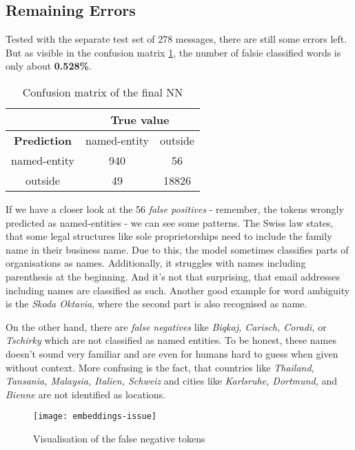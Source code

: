 \subsection{Remaining Errors}

Tested with the separate test set of 278 messages, there are still some errors left. But as visible in the confusion matrix \ref{tbl:final-errors}, the number of falsie classified words is only about \textbf{0.528\%}.

\begin{table}[ht!]
    \centering
    \begin{tabular}{|c|c|c|}
        \hline
        & \multicolumn{2}{c|}{\textbf{True value}} \\
        \hline
        \textbf{Prediction} & \cellcolor[HTML]{eaeaf2} named-entity & \cellcolor[HTML]{eaeaf2} outside \\
        \hline
        \cellcolor[HTML]{eaeaf2} named-entity & 940 & 56 \\
        \hline
        \cellcolor[HTML]{eaeaf2} outside & 49 & 18826 \\
        \hline
    \end{tabular}
    \caption{Confusion matrix of the final NN}
    \label{tbl:final-errors}
\end{table}

If we have a closer look at the 56 \emph{false positives} - remember, the tokens wrongly predicted as named-entities - we can see some patterns. The Swiss law states, that some legal structures like sole proprietorships need to include the family name in their business name. Due to this, the model sometimes classifies parts of organisations as names. Additionally, it struggles with names including parenthesis at the beginning. And it's not that surprising, that email addresses including names are classified as such. Another good example for word ambiguity is the \emph{Skoda Oktavia}, where the second part is also recognised as name.

On the other hand, there are \emph{false negatives} like \emph{Biqkaj, Carisch, Coradi,} or \emph{Tschirky} which are not classified as named entities. To be honest, these names doesn't sound very familiar and are even for humans hard to guess when given without context. More confusing is the fact, that countries like \emph{Thailand, Tansania, Malaysia, Italien, Schweiz} and cities like \emph{Karlsruhe, Dortmund,} and \emph{Bienne} are not identified as locations.

\begin{figure}[!ht]
    \centering
    \texttt{[image: embeddings-issue]}
    \caption{Visualisation of the false negative tokens}
    \label{fig:embd-issue}
\end{figure}

